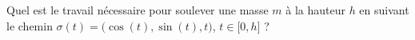 
\begin{exercice}\label{exoOutilsMath-0051}

    Quel est le travail nécessaire pour soulever une masse $m$ à la hauteur $h$ en suivant le chemin $\sigma(t)=\big( \cos(t),\sin(t),t \big)$, $t\in\mathopen[ 0 , h \mathclose]$ ?

\end{exercice}
